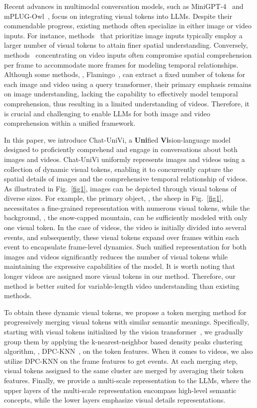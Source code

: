 \documentclass[10pt,twocolumn,letterpaper]{article}
\begin{document}
Recent advances in multimodal conversation models, such as MiniGPT-4~\cite{zhu2023minigpt} and mPLUG-Owl~\cite{ye2023mplug}, focus on integrating visual tokens into LLMs. Despite their commendable progress, existing methods often specialize in either image or video inputs. For instance, methods~\cite{liu2023visual,liu2023improved} that prioritize image inputs typically employ a larger number of visual tokens to attain finer spatial understanding. Conversely, methods~\cite{maaz2023video} concentrating on video inputs often compromise spatial comprehension per frame to accommodate more frames for modeling temporal relationships. Although some methods, \eg, Flamingo~\cite{alayrac2022flamingo}, can extract a fixed number of tokens for each image and video using a query transformer, their primary emphasis remains on image understanding, lacking the capability to effectively model temporal comprehension, thus resulting in a limited understanding of videos. Therefore, it is crucial and challenging to enable LLMs for both image and video comprehension within a unified framework.

In this paper, we introduce Chat-UniVi, a \textbf{Uni}fied \textbf{Vi}sion-language model designed to proficiently comprehend and engage in conversations about both images and videos. Chat-UniVi uniformly represents images and videos using a collection of dynamic visual tokens, enabling it to concurrently capture the spatial details of images and the comprehensive temporal relationship of videos. As illustrated in Fig.~\ref{fig1}, images can be depicted through visual tokens of diverse sizes. For example, the primary object, \ie, the sheep in Fig.~\ref{fig1}, necessitates a fine-grained representation with numerous visual tokens, while the background, \ie, the snow-capped mountain, can be sufficiently modeled with only one visual token. In the case of videos, the video is initially divided into several events, and subsequently, these visual tokens expand over frames within each event to encapsulate frame-level dynamics. Such unified representation for both images and videos significantly reduces the number of visual tokens while maintaining the expressive capabilities of the model. It is worth noting that longer videos are assigned more visual tokens in our method. Therefore, our method is better suited for variable-length video understanding than existing methods.

To obtain these dynamic visual tokens, we propose a token merging method for progressively merging visual tokens with similar semantic meanings. Specifically, starting with visual tokens initialized by the vision transformer~\cite{dosovitskiy2021an}, we gradually group them by applying the k-nearest-neighbor based density peaks clustering algorithm, \ie, DPC-KNN~\cite{du2016study}, on the token features. When it comes to videos, we also utilize DPC-KNN on the frame features to get events. At each merging step, visual tokens assigned to the same cluster are merged by averaging their token features. Finally, we provide a multi-scale representation to the LLMs, where the upper layers of the multi-scale representation encompass high-level semantic concepts, while the lower layers emphasize visual details representations.
\end{document}
